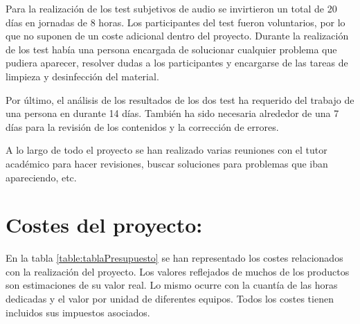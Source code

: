\documentclass[11pt,a4paper]{book}
\begin{document}
        Para la realización de los test subjetivos de audio se invirtieron un total de 20 días en jornadas de 8 horas. Los participantes del test fueron voluntarios, por lo que no suponen de un coste adicional dentro del proyecto. Durante la realización de los test había una persona encargada de solucionar cualquier problema que pudiera aparecer, resolver dudas a los participantes y encargarse de las tareas de limpieza y desinfección del material.
        
        Por último, el análisis de los resultados de los dos test ha requerido del trabajo de una persona en durante 14 días. También ha sido necesaria alrededor de una 7 días para la revisión de los contenidos y la corrección de errores.
        
        A lo largo de todo el proyecto se han realizado varias reuniones con el tutor académico para hacer revisiones, buscar soluciones para problemas que iban apareciendo, etc.
        
    \section*{Costes del proyecto:}
        En la tabla \ref{table:tablaPresupuesto} se han representado los costes relacionados con la realización del proyecto. Los valores reflejados de muchos de los productos son estimaciones de su valor real. Lo mismo ocurre con la cuantía de las horas dedicadas y el valor por unidad de diferentes equipos. Todos los costes tienen incluidos sus impuestos asociados.
        
\end{document}
